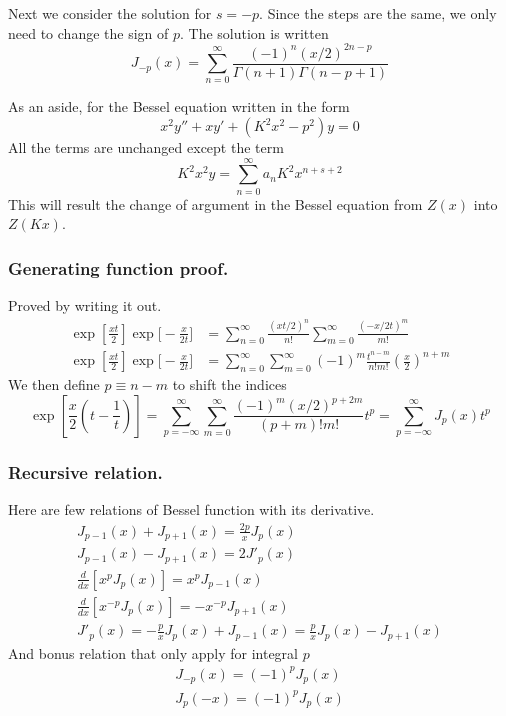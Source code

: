 \documentclass[../main.tex]{subfiles}
\begin{document}
Next we consider the solution for $s=-p$. Since the steps are the same, we only need to change the sign of $p$. The solution is written
\begin{equation*}
    J_{-p} (x)=\sum_{n=0}^{\infty}\frac{(-1)^n(x/2)^{2n-p}}{\Gamma(n+1)\Gamma(n-p+1)}
\end{equation*}

As an aside, for the Bessel equation written in the form 
\begin{equation*}
    x^2y'' +xy' + (K^2x^2- p^2 )y = 0
\end{equation*}
All the terms are unchanged except the term 
\begin{equation*}
    K^2x^2y=\sum_{n=0}^{\infty} a_n K^2x^{n+s+2}
\end{equation*}
This will result the change of argument in the Bessel equation from $Z(x)$ into $Z(Kx)$.

\subsubsection*{Generating function proof.} Proved by writing it out.
\begin{align*}
    \exp\left[\frac{xt}{2}\right] \exp\bigg[-\frac{x}{2t}\bigg]&=\sum_{n=0}^{\infty}\frac{(xt/2)^n}{n!}\sum_{m=0}^{\infty} \frac{(-x/2t)^m}{m!}\\
    \exp\left[\frac{xt}{2}\right] \exp\bigg[-\frac{x}{2t}\bigg]&=\sum_{n=0}^{\infty}\sum_{m=0}^{\infty}(-1)^m\frac{t^{n-m}}{n!m!}\left(\frac{x}{2}\right)^{n+m}
\end{align*}
We then define $p\equiv n-m$ to shift the indices
\begin{equation*}
    \exp\left[\frac{x}{2}\left(t-\frac{1}{t}\right)\right]= \sum_{p=-\infty}^{\infty}\sum_{m=0}^{\infty}\frac{(-1)^m(x/2)^{p+2m}}{(p+m)!m!}t^p=\sum_{p=-\infty}^{\infty}J_p(x)t^p
\end{equation*}

\subsubsection*{Recursive relation.} Here are few relations of Bessel function with its derivative.
\begin{gather*}
    J_{p-1}(x)+J_{p+1}(x)=\frac{2p}{x}J_p(x)\\
    J_{p-1}(x)- J_{p+1}(x)=2J'_p(x)\\
    \frac{d}{dx}[x^pJ_p(x)]=x^pJ_{p-1}(x)\\
    \frac{d}{dx}[x^{-p}J_p(x)]=-x^{-p}J_{p+1}(x)\\
    J'_p(x)=-\frac{p}{x}J_p(x)+J_{p-1}(x)=\frac{p}{x}J_p(x)-J_{p+1}(x)
\end{gather*}
And bonus relation that only apply for integral $p$
\begin{gather*}
    J_{-p}(x)=(-1)^pJ_p(x)\\
    J_p(-x)=(-1)^pJ_p(x)
\end{gather*}
\end{document}

